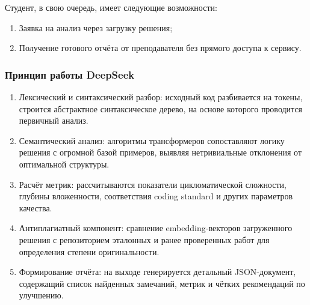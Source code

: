 Студент, в свою очередь, имеет следующие возможности:

\begin{enumerate}
    \item Заявка на анализ через загрузку решения;
    \item Получение готового отчёта от преподавателя без прямого доступа к сервису.
\end{enumerate}

\subsubsection{Принцип работы DeepSeek}

\begin{enumerate}
  \item Лексический и синтаксический разбор: исходный код разбивается на токены, строится абстрактное синтаксическое дерево, на основе которого проводится первичный анализ.
  \item Семантический анализ: алгоритмы трансформеров сопоставляют логику решения с огромной базой примеров, выявляя нетривиальные отклонения от оптимальной структуры.
  \item Расчёт метрик: рассчитываются показатели цикломатической сложности, глубины вложенности, соответствия coding standard и других параметров качества.
  \item Антиплагиатный компонент: сравнение embedding‐векторов загруженного решения с репозиторием эталонных и ранее проверенных работ для определения степени оригинальности.
  \item Формирование отчёта: на выходе генерируется детальный JSON-документ, содержащий список найденных замечаний, метрик и чётких рекомендаций по улучшению.
\end{enumerate}

